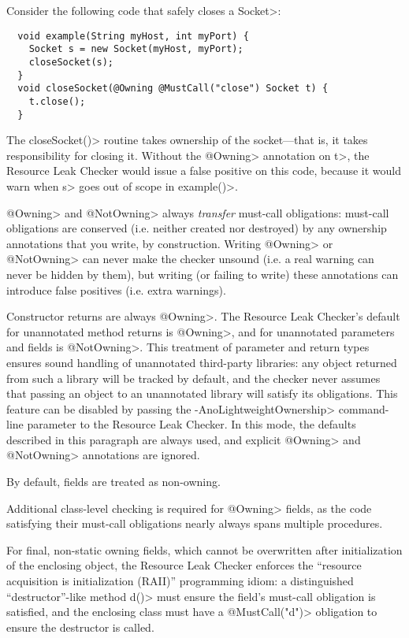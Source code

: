 
Consider the following code that safely closes a \<Socket>:

\begin{verbatim}
  void example(String myHost, int myPort) {
    Socket s = new Socket(myHost, myPort);
    closeSocket(s);
  }
  void closeSocket(@Owning @MustCall("close") Socket t) {
    t.close();
  }
\end{verbatim}

The \<closeSocket()> routine takes ownership of the socket---that is,
it takes responsibility for closing it. Without the \<@Owning>
annotation on \<t>, the Resource Leak Checker would issue a false positive on this
code, because it would warn when \<s>
goes out of scope in \<example()>.

\<@Owning> and \<@NotOwning> always \emph{transfer} must-call obligations: must-call
obligations are conserved (i.e. neither created nor destroyed) by any ownership annotations
that you write, by construction. Writing \<@Owning> or \<@NotOwning> can never make the checker
unsound (i.e. a real warning can never be hidden by them),
but writing (or failing to write) these annotations can introduce false positives (i.e. extra warnings).

Constructor returns are always \<@Owning>.
The Resource Leak Checker's default for unannotated method returns is \<@Owning>,
and for unannotated parameters and fields is \<@NotOwning>. This treatment of parameter and
return types ensures sound handling of unannotated third-party libraries: any
object returned from such a library will be tracked by default, and the checker
never assumes that passing an object to an unannotated library will satisfy its obligations.
This feature can be disabled by passing the \<-AnoLightweightOwnership> command-line parameter to the Resource
Leak Checker. In this mode, the defaults described in this paragraph are always used, and explicit \<@Owning>
and \<@NotOwning> annotations are ignored.


By default, fields are treated as non-owning.

Additional class-level checking is required for \<@Owning>
fields, as the code
satisfying their must-call obligations nearly always spans multiple
procedures.

For final, non-static owning fields,
which cannot be overwritten after initialization of the enclosing
object, the Resource Leak Checker enforces the ``resource acquisition is
initialization (RAII)'' programming idiom: a distinguished
``destructor''-like method \<d()> must ensure the field's must-call obligation is
satisfied, and the enclosing class must have a \<@MustCall("d")> obligation to
ensure the destructor is called.

